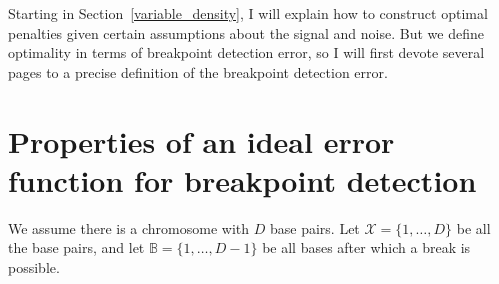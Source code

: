 \documentclass{article}
\begin{document}


Starting in Section~\ref{variable_density}, I will explain how to
construct optimal penalties given certain assumptions about the signal
and noise. But we define optimality in terms of breakpoint detection
error, so I will first devote several pages to a precise definition of
the breakpoint detection error.

\section{Properties of an ideal error function for breakpoint detection}
\label{breakpoint_error}

We assume there is a chromosome with $D$ base pairs. Let
$\mathcal X= \{1,\dots,D\}$ be all the base pairs, and let $\mathbb
B=\{1,\dots,D-1\}$ be all bases after which a break is possible.
\end{document}
